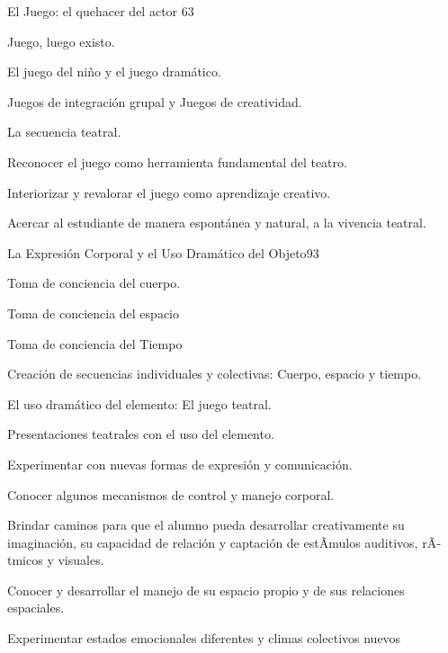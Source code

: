 \begin{syllabus}
\begin{unit}{El Juego: el  quehacer del actor }{}{6}{3}
\begin{topics}
	\item Juego, luego existo.
	\item El juego del niño y el juego dramático.
	\item Juegos de integración grupal y Juegos de creatividad.
	\item La secuencia teatral.
\end{topics}
\begin{unitgoals}
	\item Reconocer el juego como herramienta fundamental del teatro.
	\item Interiorizar y revalorar el juego como aprendizaje creativo.
	\item Acercar al estudiante de manera espontánea y natural, a la vivencia teatral.
\end{unitgoals}
\end{unit}

\begin{unit}{La Expresión Corporal y el Uso Dramático del Objeto}{}{9}{3}
\begin{topics}
	\item Toma de conciencia del cuerpo.
	\item Toma de conciencia del espacio
	\item Toma de conciencia del Tiempo
	\item Creación de secuencias individuales y colectivas: Cuerpo, espacio y tiempo.
	\item El uso dramático del elemento: El juego teatral.
	\item Presentaciones teatrales con el uso del elemento.

\end{topics}
\begin{unitgoals}
	\item Experimentar con nuevas formas de expresión y comunicación.
	\item Conocer algunos mecanismos de control y manejo corporal.
	\item Brindar caminos para que el alumno pueda desarrollar creativamente su imaginación, su capacidad de relación  y captación de estÃ­mulos auditivos, rÃ­tmicos y visuales.
	\item Conocer y desarrollar el manejo de su espacio propio  y de sus  relaciones  espaciales.
	\item Experimentar  estados emocionales diferentes y climas  colectivos nuevos
\end{unitgoals}
\end{unit}


\end{syllabus}
